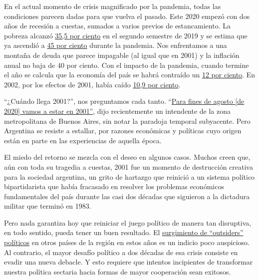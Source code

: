 En el actual momento de crisis magnificado por la pandemia, todas las
condiciones parecen dadas para que vuelva el pasado. Este 2020 empezó
con dos años de recesión a cuestas, sumados a varios previos de
estancamiento. La pobreza alcanzó
\href{https://www.clarin.com/economia/2019-termino-35-5-pobreza-8-indigencia_0__VnW6AFXG.html}{35,5
por ciento} en el segundo semestre de 2019 y se estima que ya ascendió a
\href{https://www.ambito.com/economia/pobreza/la-subio-7-puntos-la-pandemia-y-ya-se-ubica-el-45-segun-la-uca-n5114991}{45
por ciento} durante la pandemia. Nos enfrentamos a una montaña de deuda
que parece impagable (al igual que en 2001) y la inflación anual no baja
de 40 por ciento. Con el impacto de la pandemia, cuando termine el año
se calcula que la economía del país se habrá contraído un
\href{https://www.reuters.com/article/us-argentina-economy-poll/argentina-economy-to-shrink-12-in-2020-as-pandemic-batters-output-central-bank-poll-idUSKBN2442OY}{12
por ciento}. En 2002, por los efectos de 2001, había caído
\href{https://www.lanacion.com.ar/economia/el-pbi-cayo-109-por-ciento-durante-2002-nid482035/}{10,9
por ciento}.

``¿Cuándo llega 2001?'', nos preguntamos cada tanto.
``\href{https://www.batimes.com.ar/news/argentina/mario-ishii-by-late-august-well-be-where-we-were-in-2001.phtml}{Para
fines de agosto {[}de 2020{]} vamos a estar en 2001''}, dijo
recientemente un intendente de la zona metropolitana de Buenos Aires,
sin notar la paradoja temporal subyacente. Pero Argentina se resiste a
estallar, por razones económicas y políticas cuyo origen están en parte
en las experiencias de aquella época.

El miedo del retorno se mezcla con el deseo en algunos casos. Muchos
creen que, aún con toda su tragedia a cuestas, 2001 fue un momento de
destrucción creativa para la sociedad argentina, un grito de hartazgo
que reinició a un sistema político bipartidarista que había fracasado en
resolver los problemas económicos fundamentales del país durante las
casi dos décadas que siguieron a la dictadura militar que terminó en
1983.

Pero nada garantiza hoy que reiniciar el juego político de manera tan
disruptiva, en todo sentido, pueda tener un buen resultado. El
\href{https://www.nytimes3xbfgragh.onion/es/2019/02/01/espanol/opinion/crisis-partidos-politicos.html}{surgimiento
de ``outsiders'' políticos} en otros países de la región en estos años
es un indicio poco auspicioso. Al contrario, el mayor desafío político a
dos décadas de esa crisis consiste en evadir una nueva debacle. Y esto
requiere que intentos incipientes de transformar nuestra política
sectaria hacia formas de mayor cooperación sean exitosos.

